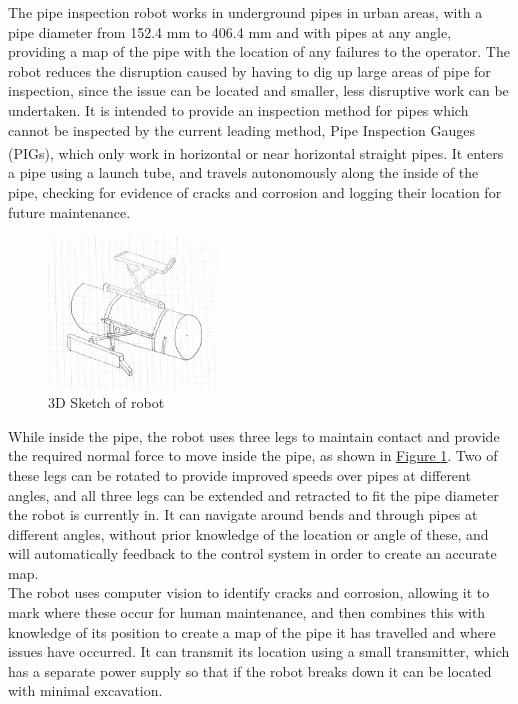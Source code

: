 \documentclass[11pt]{article}		%
\begin{document}
	The pipe inspection robot works in underground pipes in urban areas, with a pipe diameter from 152.4 mm to 406.4 mm and with pipes at any angle, providing a map of the pipe with the location of any failures to the operator. %
	The robot reduces the disruption caused by having to dig up large areas of pipe for inspection, since the issue can be located and smaller, less disruptive work can be undertaken.
	It is intended to provide an inspection method for pipes which cannot be inspected by the current leading method, Pipe Inspection Gauges (PIGs), which only work in horizontal or near horizontal straight pipes\textsuperscript{\cite{mills2017advances}}.
	It enters a pipe using a launch tube, and travels autonomously along the inside of the pipe, checking for evidence of cracks and corrosion and logging their location for future maintenance.
	\\
	\begin{figure}[h] %
		\centering
		\includegraphics[width=0.4\textwidth]{overviewDrawing}
		\caption{3D Sketch of robot}		%
		\label{3DSketch}
	\end{figure}
	While inside the pipe, the robot uses three legs to maintain contact and provide the required normal force to move inside the pipe, as shown in \hyperref[3DSketch]{Figure \ref*{3DSketch}}.
	Two of these legs can be rotated to provide improved speeds over pipes at different angles, and all three legs can be extended and retracted to fit the pipe diameter the robot is currently in.
	It can navigate around bends and through pipes at different angles, without prior knowledge of the location or angle of these, and will automatically feedback to the control system in order to create an accurate map.
	\\
	The robot uses computer vision to identify cracks and corrosion, allowing it to mark where these occur for human maintenance, and then combines this with knowledge of its position to create a map of the pipe it has travelled and where issues have occurred.
	It can transmit its location using a small transmitter, which has a separate power supply so that if the robot breaks down it can be located with minimal excavation.
	
\end{document}
